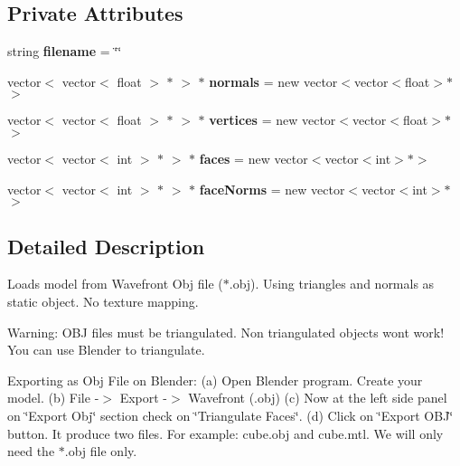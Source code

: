 \subsection*{Private Attributes}
\begin{DoxyCompactItemize}
\item 
\mbox{\label{class_obj_model_loader_aa73d94f3fe247157fb21c2eb5b37b597}} 
string {\bfseries filename} = \char`\"{}\char`\"{}
\item 
\mbox{\label{class_obj_model_loader_a93cc7093ffdb762f35bb91d05b71eaae}} 
vector$<$ vector$<$ float $>$ $\ast$ $>$ $\ast$ {\bfseries normals} = new vector$<$vector$<$float$>$$\ast$$>$
\item 
\mbox{\label{class_obj_model_loader_a5ad222f74161b20dc145c20d7d04b533}} 
vector$<$ vector$<$ float $>$ $\ast$ $>$ $\ast$ {\bfseries vertices} = new vector$<$vector$<$float$>$$\ast$$>$
\item 
\mbox{\label{class_obj_model_loader_a174ce0a1a1d5fc080fb45ef1db15bba6}} 
vector$<$ vector$<$ int $>$ $\ast$ $>$ $\ast$ {\bfseries faces} = new vector$<$vector$<$int$>$$\ast$$>$
\item 
\mbox{\label{class_obj_model_loader_aa79a3b2e391f26545929f8777c7f5207}} 
vector$<$ vector$<$ int $>$ $\ast$ $>$ $\ast$ {\bfseries face\+Norms} = new vector$<$vector$<$int$>$$\ast$$>$
\end{DoxyCompactItemize}


\subsection{Detailed Description}
Loads model from Wavefront Obj file ($\ast$.obj). Using triangles and normals as static object. No texture mapping.

Warning\+: O\+BJ files must be triangulated. Non triangulated objects wont work! You can use Blender to triangulate.

Exporting as Obj File on Blender\+: (a) Open Blender program. Create your model. (b) File -\/$>$ Export -\/$>$ Wavefront (.obj) (c) Now at the left side panel on \char`\"{}\+Export Obj\char`\"{} section check on \char`\"{}\+Triangulate Faces\char`\"{}. (d) Click on \char`\"{}\+Export O\+B\+J\char`\"{} button. It produce two files. For example\+: cube.\+obj and cube.\+mtl. We will only need the $\ast$.obj file only.


